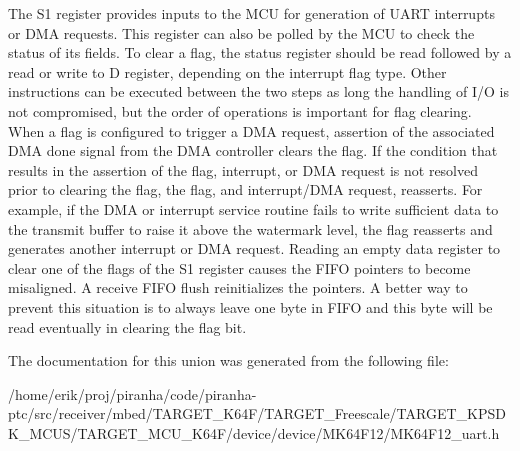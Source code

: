 The S1 register provides inputs to the M\+CU for generation of U\+A\+RT interrupts or D\+MA requests. This register can also be polled by the M\+CU to check the status of its fields. To clear a flag, the status register should be read followed by a read or write to D register, depending on the interrupt flag type. Other instructions can be executed between the two steps as long the handling of I/O is not compromised, but the order of operations is important for flag clearing. When a flag is configured to trigger a D\+MA request, assertion of the associated D\+MA done signal from the D\+MA controller clears the flag. If the condition that results in the assertion of the flag, interrupt, or D\+MA request is not resolved prior to clearing the flag, the flag, and interrupt/\+D\+MA request, reasserts. For example, if the D\+MA or interrupt service routine fails to write sufficient data to the transmit buffer to raise it above the watermark level, the flag reasserts and generates another interrupt or D\+MA request. Reading an empty data register to clear one of the flags of the S1 register causes the F\+I\+FO pointers to become misaligned. A receive F\+I\+FO flush reinitializes the pointers. A better way to prevent this situation is to always leave one byte in F\+I\+FO and this byte will be read eventually in clearing the flag bit. 

The documentation for this union was generated from the following file\+:\begin{DoxyCompactItemize}
\item 
/home/erik/proj/piranha/code/piranha-\/ptc/src/receiver/mbed/\+T\+A\+R\+G\+E\+T\+\_\+\+K64\+F/\+T\+A\+R\+G\+E\+T\+\_\+\+Freescale/\+T\+A\+R\+G\+E\+T\+\_\+\+K\+P\+S\+D\+K\+\_\+\+M\+C\+U\+S/\+T\+A\+R\+G\+E\+T\+\_\+\+M\+C\+U\+\_\+\+K64\+F/device/device/\+M\+K64\+F12/M\+K64\+F12\+\_\+uart.\+h\end{DoxyCompactItemize}
